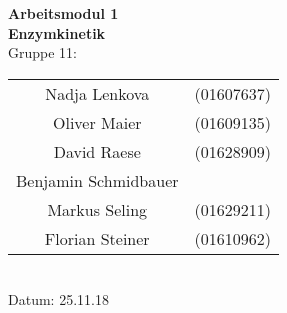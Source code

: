 \begin{titlepage}
  \begin{center}
    \phantom{hallo}
    \vspace{2cm}
    \Huge{\bfseries{Arbeitsmodul 1}}\\
    \vspace{1.5cm}
    \huge{\bfseries{Enzymkinetik}}\\
    \vspace{1.5cm}
    \huge{Gruppe 11}:\\
    \vspace{1cm}
    \begin{tabular}{cc}
      
      Nadja Lenkova & (01607637)\\
      Oliver Maier & (01609135)\\
      David Raese  & (01628909)\\
      Benjamin Schmidbauer & \\
      Markus Seling & (01629211)\\
      Florian Steiner & (01610962)\\
    \end{tabular} \\
    \vspace{1cm}
    Datum: 25.11.18
  \end{center}
\end{titlepage}